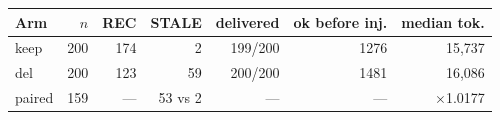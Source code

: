 \begin{tabular}{lrrrrrr}
\toprule
Arm & $n$ & REC & STALE & delivered & ok before inj. & median tok. \\
\midrule
keep & 200 & 174 & 2 & 199/200 & 1276 & 15,737 \\
del  & 200 & 123 & 59 & 200/200 & 1481 & 16,086 \\
\midrule
paired & 159 & --- & 53 vs 2 & --- & --- & $\times$1.0177 \\
\bottomrule
\end{tabular}
